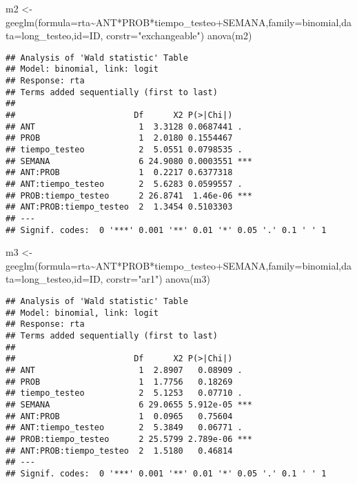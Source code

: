 \documentclass[
]{article}
\newenvironment{Shaded}{\begin{snugshade}}{\end{snugshade}}
\newcommand{\AttributeTok}[1]{\textcolor[rgb]{0.77,0.63,0.00}{#1}}
\newcommand{\FunctionTok}[1]{\textcolor[rgb]{0.00,0.00,0.00}{#1}}
\newcommand{\NormalTok}[1]{#1}
\newcommand{\OtherTok}[1]{\textcolor[rgb]{0.56,0.35,0.01}{#1}}
\newcommand{\SpecialCharTok}[1]{\textcolor[rgb]{0.00,0.00,0.00}{#1}}
\newcommand{\StringTok}[1]{\textcolor[rgb]{0.31,0.60,0.02}{#1}}
\begin{document}
\begin{Shaded}
\begin{Highlighting}[]
\NormalTok{m2 }\OtherTok{\textless{}{-}} \FunctionTok{geeglm}\NormalTok{(}\AttributeTok{formula=}\NormalTok{rta}\SpecialCharTok{\textasciitilde{}}\NormalTok{ANT}\SpecialCharTok{*}\NormalTok{PROB}\SpecialCharTok{*}\NormalTok{tiempo\_testeo}\SpecialCharTok{+}\NormalTok{SEMANA,}\AttributeTok{family=}\NormalTok{binomial,}\AttributeTok{data=}\NormalTok{long\_testeo,}\AttributeTok{id=}\NormalTok{ID,}
             \AttributeTok{corstr=}\StringTok{"exchangeable"}\NormalTok{)}
\FunctionTok{anova}\NormalTok{(m2)}
\end{Highlighting}
\end{Shaded}

\begin{verbatim}
## Analysis of 'Wald statistic' Table
## Model: binomial, link: logit
## Response: rta
## Terms added sequentially (first to last)
## 
##                        Df      X2 P(>|Chi|)    
## ANT                     1  3.3128 0.0687441 .  
## PROB                    1  2.0180 0.1554467    
## tiempo_testeo           2  5.0551 0.0798535 .  
## SEMANA                  6 24.9080 0.0003551 ***
## ANT:PROB                1  0.2217 0.6377318    
## ANT:tiempo_testeo       2  5.6283 0.0599557 .  
## PROB:tiempo_testeo      2 26.8741  1.46e-06 ***
## ANT:PROB:tiempo_testeo  2  1.3454 0.5103303    
## ---
## Signif. codes:  0 '***' 0.001 '**' 0.01 '*' 0.05 '.' 0.1 ' ' 1
\end{verbatim}

\begin{Shaded}
\begin{Highlighting}[]
\NormalTok{m3 }\OtherTok{\textless{}{-}} \FunctionTok{geeglm}\NormalTok{(}\AttributeTok{formula=}\NormalTok{rta}\SpecialCharTok{\textasciitilde{}}\NormalTok{ANT}\SpecialCharTok{*}\NormalTok{PROB}\SpecialCharTok{*}\NormalTok{tiempo\_testeo}\SpecialCharTok{+}\NormalTok{SEMANA,}\AttributeTok{family=}\NormalTok{binomial,}\AttributeTok{data=}\NormalTok{long\_testeo,}\AttributeTok{id=}\NormalTok{ID,}
             \AttributeTok{corstr=}\StringTok{"ar1"}\NormalTok{)}
\FunctionTok{anova}\NormalTok{(m3)}
\end{Highlighting}
\end{Shaded}

\begin{verbatim}
## Analysis of 'Wald statistic' Table
## Model: binomial, link: logit
## Response: rta
## Terms added sequentially (first to last)
## 
##                        Df      X2 P(>|Chi|)    
## ANT                     1  2.8907   0.08909 .  
## PROB                    1  1.7756   0.18269    
## tiempo_testeo           2  5.1253   0.07710 .  
## SEMANA                  6 29.0655 5.912e-05 ***
## ANT:PROB                1  0.0965   0.75604    
## ANT:tiempo_testeo       2  5.3849   0.06771 .  
## PROB:tiempo_testeo      2 25.5799 2.789e-06 ***
## ANT:PROB:tiempo_testeo  2  1.5180   0.46814    
## ---
## Signif. codes:  0 '***' 0.001 '**' 0.01 '*' 0.05 '.' 0.1 ' ' 1
\end{verbatim}
\end{document}
